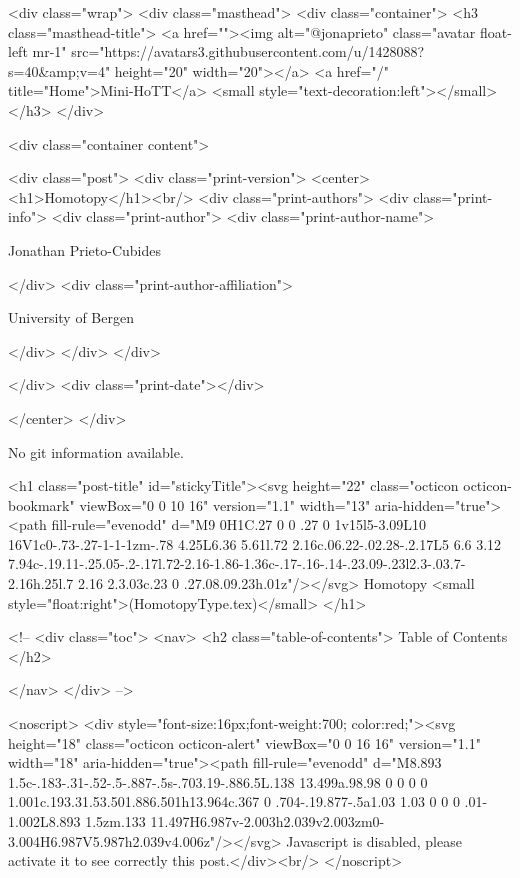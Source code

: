     <div class="wrap">
      <div class="masthead">
        <div class="container">
          <h3 class="masthead-title">
            <a href=""><img alt="@jonaprieto" class="avatar float-left mr-1" src="https://avatars3.githubusercontent.com/u/1428088?s=40&amp;v=4" height="20" width="20"></a>
            <a href="/" title="Home">Mini-HoTT</a>
            <small style="text-decoration:left"></small>
          </h3>
        </div>
      
      <div class="container content">
        







<div class="post">
  <div class="print-version">
    <center>
      <h1>Homotopy</h1><br/>
        <div class="print-authors">
          <div class="print-info">
            <div class="print-author">
              <div class="print-author-name">
                
                  Jonathan Prieto-Cubides
                
              </div>
              <div class="print-author-affiliation">
                
                  University of Bergen
                
                </div>
            </div>
          </div>
          
          
        </div>
        <div class="print-date"></div>
        
        
    </center>
  </div>

  
  No git information available.
  

  <h1 class="post-title" id="stickyTitle"><svg height="22" class="octicon octicon-bookmark" viewBox="0 0 10 16" version="1.1" width="13" aria-hidden="true"><path fill-rule="evenodd" d="M9 0H1C.27 0 0 .27 0 1v15l5-3.09L10 16V1c0-.73-.27-1-1-1zm-.78 4.25L6.36 5.61l.72 2.16c.06.22-.02.28-.2.17L5 6.6 3.12 7.94c-.19.11-.25.05-.2-.17l.72-2.16-1.86-1.36c-.17-.16-.14-.23.09-.23l2.3-.03.7-2.16h.25l.7 2.16 2.3.03c.23 0 .27.08.09.23h.01z"/></svg> Homotopy <small style="float:right">(HomotopyType.tex)</small>
  </h1>

  <!-- 
  <div class="toc">
    <nav>
    <h2 class="table-of-contents"> Table of Contents </h2>
      

    </nav>
  </div>
   -->

  <noscript>
  <div style="font-size:16px;font-weight:700; color:red;"><svg height="18" class="octicon octicon-alert" viewBox="0 0 16 16" version="1.1" width="18" aria-hidden="true"><path fill-rule="evenodd" d="M8.893 1.5c-.183-.31-.52-.5-.887-.5s-.703.19-.886.5L.138 13.499a.98.98 0 0 0 0 1.001c.193.31.53.501.886.501h13.964c.367 0 .704-.19.877-.5a1.03 1.03 0 0 0 .01-1.002L8.893 1.5zm.133 11.497H6.987v-2.003h2.039v2.003zm0-3.004H6.987V5.987h2.039v4.006z"/></svg> Javascript is disabled, please activate it to see correctly this post.</div><br/>
  </noscript>

